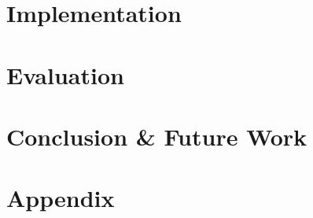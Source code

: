 \documentclass[bachelor,english]{infothesis}
\begin{document}
\chapter{Implementation}
	

%	

\chapter{Evaluation}
	

\chapter{Conclusion \& Future Work}

\chapter{Appendix}
	


\clearpage


\end{document}
